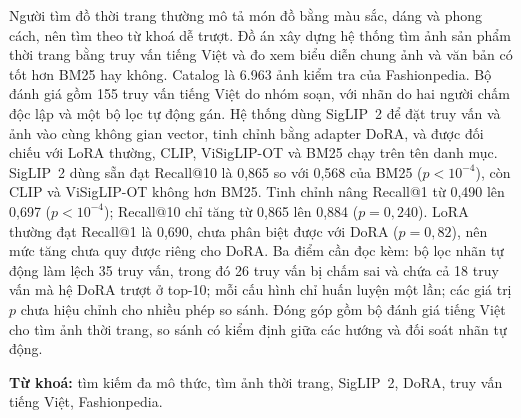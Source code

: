 
Người tìm đồ thời trang thường mô tả món đồ bằng màu sắc, dáng và phong cách, nên tìm theo từ khoá dễ trượt. Đồ án xây dựng hệ thống tìm ảnh sản phẩm thời trang bằng truy vấn tiếng Việt và đo xem biểu diễn chung ảnh và văn bản có tốt hơn BM25 hay không. Catalog là 6.963 ảnh kiểm tra của Fashionpedia. Bộ đánh giá gồm 155 truy vấn tiếng Việt do nhóm soạn, với nhãn do hai người chấm độc lập và một bộ lọc tự động gán. Hệ thống dùng SigLIP~2 để đặt truy vấn và ảnh vào cùng không gian vector, tinh chỉnh bằng adapter DoRA, và được đối chiếu với LoRA thường, CLIP, ViSigLIP-OT và BM25 chạy trên tên danh mục. SigLIP~2 dùng sẵn đạt Recall@10 là 0,865 so với 0,568 của BM25 ($p < 10^{-4}$), còn CLIP và ViSigLIP-OT không hơn BM25. Tinh chỉnh nâng Recall@1 từ 0,490 lên 0,697 ($p < 10^{-4}$); Recall@10 chỉ tăng từ 0,865 lên 0,884 ($p = 0{,}240$). LoRA thường đạt Recall@1 là 0,690, chưa phân biệt được với DoRA ($p = 0{,}82$), nên mức tăng chưa quy được riêng cho DoRA. Ba điểm cần đọc kèm: bộ lọc nhãn tự động làm lệch 35 truy vấn, trong đó 26 truy vấn bị chấm sai và chứa cả 18 truy vấn mà hệ DoRA trượt ở top-10; mỗi cấu hình chỉ huấn luyện một lần; các giá trị $p$ chưa hiệu chỉnh cho nhiều phép so sánh. Đóng góp gồm bộ đánh giá tiếng Việt cho tìm ảnh thời trang, so sánh có kiểm định giữa các hướng và đối soát nhãn tự động.

\medskip
\noindent\textbf{Từ khoá:} tìm kiếm đa mô thức, tìm ảnh thời trang, SigLIP~2, DoRA, truy vấn tiếng Việt, Fashionpedia.
